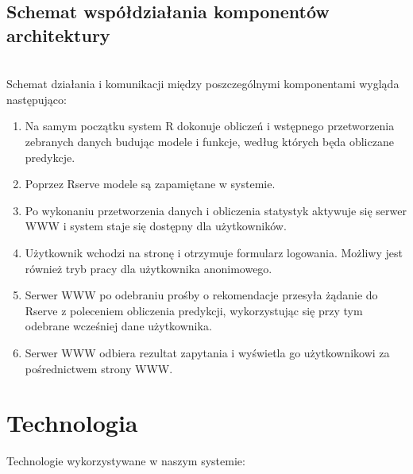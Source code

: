 \documentclass[licencjacka]{pracamgr}
\begin{document}
\section{Schemat współdziałania komponentów architektury}
~\\ \indent
Schemat działania i komunikacji między poszczególnymi komponentami wygląda następująco:
\begin{enumerate}

\item Na samym początku system R dokonuje obliczeń i wstępnego przetworzenia zebranych danych budując modele i funkcje, według których będa obliczane predykcje.

\item Poprzez Rserve modele są zapamiętane w systemie.

\item Po wykonaniu przetworzenia danych i obliczenia statystyk aktywuje się serwer WWW i system staje się dostępny dla użytkowników.

\item Użytkownik wchodzi na stronę i otrzymuje formularz logowania. Możliwy jest również tryb pracy dla użytkownika anonimowego.

\item Serwer WWW po odebraniu prośby o rekomendacje przesyła żądanie do Rserve z poleceniem obliczenia predykcji, wykorzystując się przy tym odebrane wcześniej dane użytkownika.

\item Serwer WWW odbiera rezultat zapytania i wyświetla go użytkownikowi za pośrednictwem strony WWW.

\end{enumerate}


 \chapter{Technologia}
Technologie wykorzystywane w naszym systemie: \par
\end{document}
